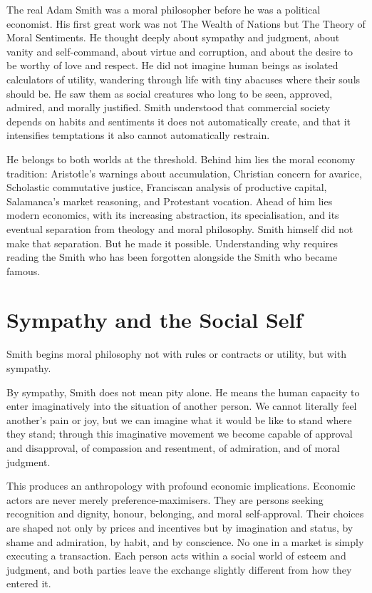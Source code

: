 \documentclass[11pt,a4paper,oneside]{book}
\begin{document}
The real Adam Smith was a moral philosopher before he was a political economist. His first great work was not The Wealth of Nations but The Theory of Moral Sentiments. He thought deeply about sympathy and judgment, about vanity and self-command, about virtue and corruption, and about the desire to be worthy of love and respect. He did not imagine human beings as isolated calculators of utility, wandering through life with tiny abacuses where their souls should be. He saw them as social creatures who long to be seen, approved, admired, and morally justified. Smith understood that commercial society depends on habits and sentiments it does not automatically create, and that it intensifies temptations it also cannot automatically restrain.

He belongs to both worlds at the threshold. Behind him lies the moral economy tradition: Aristotle's warnings about accumulation, Christian concern for avarice, Scholastic commutative justice, Franciscan analysis of productive capital, Salamanca's market reasoning, and Protestant vocation. Ahead of him lies modern economics, with its increasing abstraction, its specialisation, and its eventual separation from theology and moral philosophy. Smith himself did not make that separation. But he made it possible. Understanding why requires reading the Smith who has been forgotten alongside the Smith who became famous.

\section*{Sympathy and the Social Self}

Smith begins moral philosophy not with rules or contracts or utility, but with sympathy.

By sympathy, Smith does not mean pity alone. He means the human capacity to enter imaginatively into the situation of another person. We cannot literally feel another's pain or joy, but we can imagine what it would be like to stand where they stand; through this imaginative movement we become capable of approval and disapproval, of compassion and resentment, of admiration, and of moral judgment.

This produces an anthropology with profound economic implications. Economic actors are never merely preference-maximisers. They are persons seeking recognition and dignity, honour, belonging, and moral self-approval. Their choices are shaped not only by prices and incentives but by imagination and status, by shame and admiration, by habit, and by conscience. No one in a market is simply executing a transaction. Each person acts within a social world of esteem and judgment, and both parties leave the exchange slightly different from how they entered it.
\end{document}
